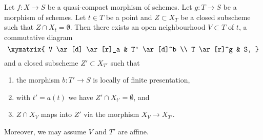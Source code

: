 \begin{lemma}
\label{lemma-separate}
Let $f : X \to S$ be a quasi-compact morphism of schemes.
Let $g : T \to S$ be a morphism of schemes.
Let $t \in T$ be a point and $Z \subset X_T$ be a closed
subscheme such that $Z \cap X_t = \emptyset$.
Then there exists an open neighbourhood
$V \subset T$ of $t$, a commutative diagram
$$
\xymatrix{
V \ar[d] \ar[r]_a & T' \ar[d]^b \\
T \ar[r]^g & S,
}
$$
and a closed subscheme $Z' \subset X_{T'}$ such that
\begin{enumerate}
\item the morphism $b : T' \to S$ is locally of finite presentation,
\item with $t' = a(t)$ we have $Z' \cap X_{t'} = \emptyset$, and
\item $Z \cap X_V$ maps into $Z'$ via the morphism $X_V \to X_{T'}$.
\end{enumerate}
Moreover, we may assume $V$ and $T'$ are affine.
\end{lemma}

